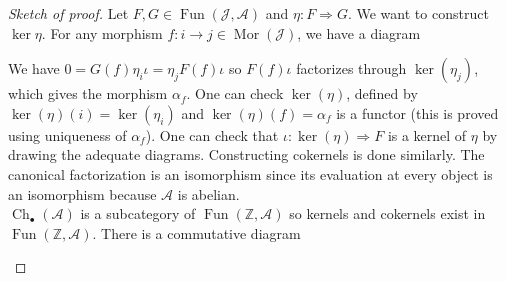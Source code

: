 \documentclass{article}
\newcommand{\Z}{\mathbb{Z}}
\newcommand{\Jcat}{\mathcal{J}}
\newcommand{\Acat}{\mathcal{A}}
\DeclareMathOperator{\Ch}{Ch}
\DeclareMathOperator{\Mor}{Mor}
\DeclareMathOperator{\Fun}{Fun}
\theoremstyle{plain}
\theoremstyle{definition}
\theoremstyle{remark}
\begin{document}
\begin{proof}[Sketch of proof]
    Let $F,G \in \Fun(\Jcat,\Acat)$ and $\eta : F \Rightarrow G$. We want to construct $\ker \eta$. For any morphism $f : i \to j \in \Mor(\Jcat)$, we have a diagram
    \begin{center}
    \end{center}
    We have $0 = G(f) \eta_i \iota = \eta_j F(f) \iota$ so $F(f)\iota$ factorizes through $\ker(\eta_j)$, which gives the morphism $\alpha_f$. One can check $\ker(\eta)$, defined by $\ker(\eta)(i)=\ker(\eta_i)$ and $\ker(\eta)(f)=\alpha_f$ is a functor (this is proved using uniqueness of $\alpha_f$). One can check that $\iota : \ker(\eta) \Rightarrow F$ is a kernel of $\eta$ by drawing the adequate diagrams. Constructing cokernels is done similarly. The canonical factorization is an isomorphism since its evaluation at every object is an isomorphism because $\Acat$ is abelian. \\
    $\Ch_\bullet(\Acat)$ is a subcategory of $\Fun(\Z,\Acat)$ so kernels and cokernels exist in $\Fun(\Z,\Acat)$. There is a commutative diagram
    \begin{center}
\end{center}
\end{proof}
\end{document}
